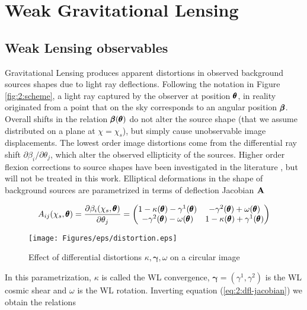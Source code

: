 
\section{Weak Gravitational Lensing}

\subsection{Weak Lensing observables}
Gravitational Lensing produces apparent distortions in observed background sources shapes due to light ray deflections. Following the notation in Figure \ref{fig:2:scheme}, a light ray captured by the observer at position $\pmb{\theta}$, in reality originated from a point that on the sky corresponds to an angular position $\pmb{\beta}$. Overall shifts in the relation $\pmb{\beta}(\pmb{\theta})$ do not alter the source shape (that we assume distributed on a plane at $\chi=\chi_s$), but simply cause unobservable image displacements. The lowest order image distortions come from the differential ray shift $\partial \beta_i/\partial \theta_j$, which alter the observed ellipticity of the sources. Higher order flexion corrections to source shapes have been investigated in the literature \citep{BornFlexion}, but will not be treated in this work. Elliptical deformations in the shape of background sources are parametrized in terms of deflection Jacobian $\mathbf{A}$

\begin{equation}
\label{eq:2:dfl-jacobian}
A_{ij}(\chi_s,\pmb{\theta}) = \frac{\partial \beta_i(\chi_s,\pmb{\theta})}{\partial \theta_j} = 
\begin{pmatrix}
1-\kappa(\pmb{\theta})-\gamma^1(\pmb{\theta}) & -\gamma^2(\pmb{\theta})+\omega(\pmb{\theta}) \\
-\gamma^2(\pmb{\theta})-\omega(\pmb{\theta}) & 1-\kappa(\pmb{\theta})+\gamma^1(\pmb{\theta})
\end{pmatrix}
\end{equation}  
%
\begin{figure}
\begin{center}
\texttt{[image: Figures/eps/distortion.eps]}
\end{center}
\caption{Effect of differential distortions $\kappa,\pmb{\gamma},\omega$ on a circular image}
\label{fig:2:distortion}
\end{figure}
%
In this parametrization, $\kappa$ is called the WL convergence, $\pmb{\gamma}=(\gamma^1,\gamma^2)$ is the WL cosmic shear and $\omega$ is the WL rotation. Inverting equation (\ref{eq:2:dfl-jacobian}) we obtain the relations

